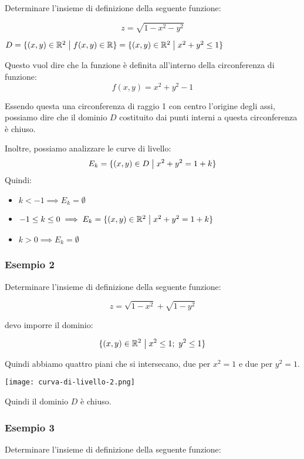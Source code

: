 Determinare l'insieme di definizione della seguente funzione:

\[
    z = \sqrt{1-x^{2}-y^{2}}
\]

\(D = \{(x,y) \in \mathbb{R}^2 \;\big|\; f(x,y) \in \mathbb{R} \} = \{(x,y) \in \mathbb{R}^{2} \;\big|\; x^{2}+y^{2} \le 1\} \)

Questo vuol dire che la funzione è definita all'interno della circonferenza di funzione:
\[
    f(x,y) = x^2+y^2-1
\]

Essendo questa una circonferenza di raggio 1 con centro l'origine degli assi, possiamo dire che il dominio \(D\) costituito dai punti interni a questa circonferenza è chiuso.

Inoltre, possiamo analizzare le curve di livello:
\[
    E_k = \{(x,y) \in D \;\big|\; x^2+y^2=1+k\}
\]
Quindi:
\begin{itemize}
    \item \(k<-1 \implies E_k = \emptyset \)
    \item \(-1\le k \le 0 \implies E_k = \{(x,y)\in \mathbb{R}^{2} \;\big|\; x^2+y^2=1+k\} \)
    \item \(k>0 \implies E_k = \emptyset \)
\end{itemize}

\filbreak{}
\subsubsection*{Esempio 2}

Determinare l'insieme di definizione della seguente funzione:

\[
    z = \sqrt{1-x^{2}}+\sqrt{1-y^{2}}
\]

devo imporre il dominio:

\[
    \{(x,y) \in \mathbb{R}^{2} \;\big|\; x^{2}\le 1;\ y^{2}\le 1\}
\]

Quindi abbiamo quattro piani che si intersecano, due per \(x^2=1\) e due per \(y^2=1\).

\begin{center}
    \texttt{[image: curva-di-livello-2.png]}
\end{center}

Quindi il dominio \(D\) è chiuso.

\pagebreak
\subsubsection*{Esempio 3}

Determinare l'insieme di definizione della seguente funzione:

